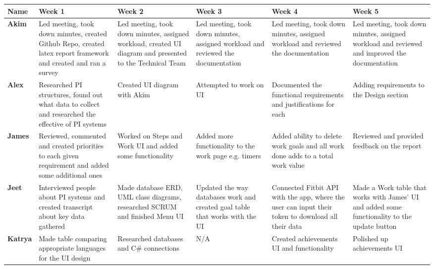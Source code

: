 \documentclass[11pt]{article}
\begin{document}
\begin{table}[!ht]
\begin{adjustwidth}{-3cm}{-3cm}
\centering
\begin{tabular}{|p{1.5cm}|p{3.1cm}|p{3cm}|p{3cm}|p{3cm}|p{3cm}|}
\hline
\textbf {Name} & \textbf{Week 1} & \textbf{Week 2} & \textbf{Week 3} & \textbf{Week 4} & \textbf{Week 5} \\
\hline
\textbf{Akim} & Led meeting, took down minutes, created Github Repo, created latex report framework and created and ran a survey& Led meeting, took down minutes, assigned workload, created UI diagram and presented to the Technical Team &  Led meeting, took down minutes, assigned workload and reviewed the documentation &  Led meeting, took down minutes, assigned workload and reviewed the documentation& Led meeting, took down minutes, assigned workload and reviewed and improved the documentation \\
\hline
\textbf{Alex} & Researched PI structures, found out what data to collect and researched the effective of PI systems & Created UI diagram with Akim & Attempted to work on UI  & Documented the functional requirements and justifications for each & Adding requirements to the Design section \\
\hline
\textbf{James} & Reviewed, commented and created priorities to each given requirement and added some additional ones & Worked on Steps and Work UI and added some functionality & Added more functionality to the work page e.g. timers & Added ability to delete work goals and all work done adds to a total work value & Reviewed and provided feedback on the report \\
\hline
\textbf{Jeet} & Interviewed people about PI systems and created transcript about key data gathered & Made database ERD, UML class diagrams, researched SCRUM and finished Menu UI & Updated the way databases work and created goal table that works with the UI & Connected Fitbit API with the app, where the user can input their token to download all their data & Made a Work table that works with James' UI and added some functionality to the update button \\
\hline
\textbf{Katrya} & Made table comparing appropriate languages for the UI design & Researched databases and C\# connections & N/A & Created achievements UI and functionality & Polished up achievements UI \\
\hline
\end{tabular}
\end{adjustwidth}
\end{table}
\end{document}
